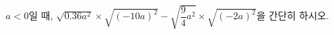 $a<0$일 때, $\sqrt{0.36a^2}\times\sqrt{(-10a)^2}-\sqrt{\dfrac{9}{4}a^2}\times\sqrt{(-2a)^2}$을 간단히 하시오.
